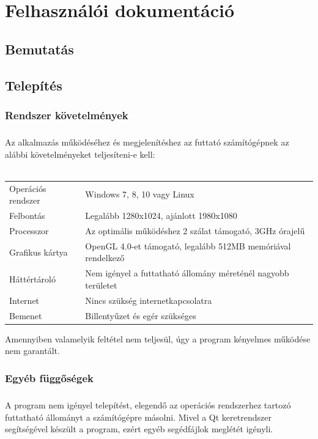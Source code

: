 \documentclass[12pt]{report}
\begin{document}
\chapter{Felhasználói dokumentáció}

\section{Bemutatás}

\section{Telepítés}

\subsection{Rendszer követelmények}
\paragraph{}
Az alkalmazás működéséhez és megjelenítéshez az futtató számítógépnek az alábbi követelményeket teljesíteni-e kell: \\ \\
\begin{tabular}{l | l}
Operációs rendszer & Windows 7, 8, 10 vagy Linux \\
Felbontás & Legalább 1280x1024, ajánlott 1980x1080 \\
Processzor & Az optimális működéshez 2 szálat támogató, 3GHz órajelű \\
Grafikus kártya & OpenGL 4.0-et támogató, legalább 512MB memóriával rendelkező \\
Háttértároló & Nem igényel a futtatható állomány méreténél nagyobb területet \\
Internet & Nincs szükség internetkapcsolatra \\
Bemenet & Billentyűzet és egér szükséges
\end{tabular}
Amennyiben valamelyik feltétel nem teljesül, úgy a program kényelmes működése nem garantált.

\subsection{Egyéb függőségek}
\paragraph{}
A program nem igényel telepítést, elegendő az operációs rendszerhez tartozó futtatható állományt a számítógépre másolni. Mivel a Qt keretrendszer segítségével készült a program, ezért egyéb segédfájlok meglétét igényli.
\end{document}
